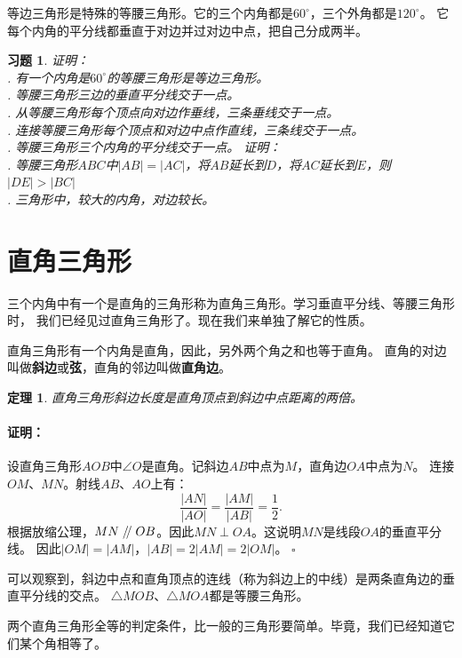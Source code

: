\documentclass[12pt,UTF8]{ctexbook}
\newtheorem{tm}{定理}[section]
\newenvironment{proof2}{\paragraph{\textbf{证明：}}}{\hfill$\square$}
\newtheorem{xt}{习题}[section]
\renewcommand\parallel{\mathrel{/\mskip-4mu/}}
\begin{document}
等边三角形是特殊的等腰三角形。它的三个内角都是$60^\circ$，三个外角都是$120^\circ$。
它每个内角的平分线都垂直于对边并过对边中点，把自己分成两半。

\begin{xt}\label{xt:4-0-0}
    证明：\\
    . 有一个内角是$60^\circ$的等腰三角形是等边三角形。\\
    . 等腰三角形三边的垂直平分线交于一点。\\
    . 从等腰三角形每个顶点向对边作垂线，三条垂线交于一点。\\
    . 连接等腰三角形每个顶点和对边中点作直线，三条线交于一点。\\
    . 等腰三角形三个内角的平分线交于一点。
    证明： \\
    . 等腰三角形$ABC$中$|AB| = |AC|$，将$AB$延长到$D$，将$AC$延长到$E$，则$|DE| > |BC|$\\
    . 三角形中，较大的内角，对边较长。
\end{xt}

\section{直角三角形}
三个内角中有一个是直角的三角形称为直角三角形。学习垂直平分线、等腰三角形时，
我们已经见过直角三角形了。现在我们来单独了解它的性质。

直角三角形有一个内角是直角，因此，另外两个角之和也等于直角。
直角的对边叫做\textbf{斜边}或\textbf{弦}，直角的邻边叫做\textbf{直角边}。

\begin{tm}\label{tm:4-1-0}
    直角三角形斜边长度是直角顶点到斜边中点距离的两倍。
\end{tm}
\begin{proof2}
    设直角三角形$AOB$中$\angle O$是直角。记斜边$AB$中点为$M$，直角边$OA$中点为$N$。
    连接$OM$、$MN$。射线$AB$、$AO$上有：
    $$ \frac{|AN|}{|AO|} = \frac{|AM|}{|AB|} = \frac12.$$
    根据放缩公理，$MN \parallel OB$。因此$MN \perp OA$。这说明$MN$是线段$OA$的垂直平分线。
    因此$|OM| = |AM|$，$|AB| = 2|AM| = 2|OM|$。
\end{proof2}

可以观察到，斜边中点和直角顶点的连线（称为斜边上的中线）是两条直角边的垂直平分线的交点。
$\triangle MOB$、$\triangle MOA$都是等腰三角形。

两个直角三角形全等的判定条件，比一般的三角形要简单。毕竟，我们已经知道它们某个角相等了。
\end{document}
